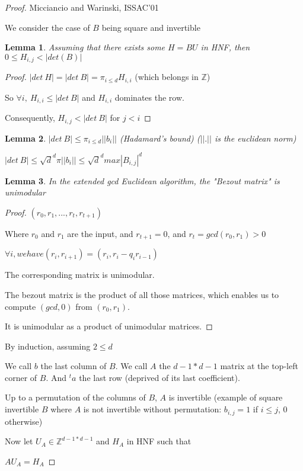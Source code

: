 \documentclass[a4paper,10pt]{article}
\newtheorem{lemm}{Lemma}
\begin{document}
\begin{proof}
Micciancio and Warinski, ISSAC'01

We consider the case of $B$ being square and invertible
\begin{lemm}
Assuming that there exists some $H= B U$ in HNF, then $0 \leq H_{i,j} < |det(B)|$
\end{lemm}
\begin{proof}
$|det \ H|=|det \ B|=\pi_{i \leq d} H_{i,i}$ (which belongs in $\mathbb{Z}$)

So $\forall i, \ H_{i,i} \leq |det \ B| $ and $H_{i,i}$ dominates the row.

Consequently, $H_{i,j} < |det \ B|$ for $j < i$
\end{proof}

\begin{lemm}
$|det \ B| \leq \pi_{i \leq d} || b_i || $ (Hadamard's bound) ($||.||$ is the euclidean norm)
\end{lemm}
$|det \ B| \leq \sqrt{d}^{d} \pi || b_i || \leq \sqrt{d}^{d} max |B_{i,j}|^d$
\begin{lemm}
In the extended gcd Euclidean algorithm, the "Bezout matrix" is unimodular
\end{lemm}
\begin{proof}
$(r_0,r_1,...,r_t,r_{t+1})$

Where $r_0$ and $r_1$ are the input, and $r_{t+1}=0$, and $r_t=gcd(r_0,r_1)>0$

$\forall i, we have (r_i,r_{i+1})=(r_i,r_i-q_i r_{i-1})$

The corresponding matrix is unimodular.

The bezout matrix is the product of all those matrices, which enables us to compute $(gcd,0)$ from $(r_0,r_1)$.

It is unimodular as a product of unimodular matrices.
\end{proof}
By induction, assuming $2 \leq d$

We call $b$ the last column of $B$. We call $A$ the $d-1*d-1$ matrix at the top-left corner of $B$. And $^ta$ the last row (deprived of its last coefficient).

Up to a permutation of the columns of $B$, $A$ is invertible (example of square invertible $B$ where $A$ is not invertible without permutation: $b_{i,j}=1$ if $i \leq j$, $0$ otherwise)

Now let $U_A \in \mathbb{Z}^{d-1*d-1}$ and $H_A$ in HNF such that

$A U_A = H_A$


\end{proof}
\end{document}
